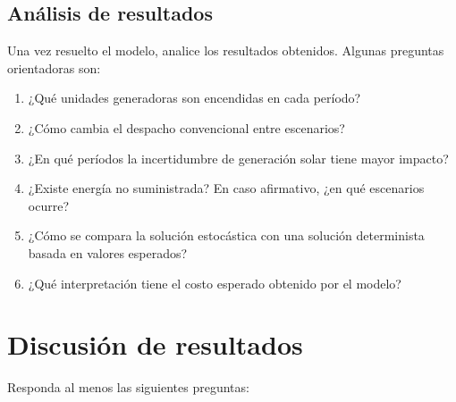 \documentclass[
	spanish, %
	letterpaper, oneside
]{article}
\begin{document}
\subsection{Análisis de resultados}

Una vez resuelto el modelo, analice los resultados obtenidos. Algunas preguntas orientadoras son:

\begin{enumerate}
\item ¿Qué unidades generadoras son encendidas en cada período?
\item ¿Cómo cambia el despacho convencional entre escenarios?
\item ¿En qué períodos la incertidumbre de generación solar tiene mayor impacto?
\item ¿Existe energía no suministrada? En caso afirmativo, ¿en qué escenarios ocurre?
\item ¿Cómo se compara la solución estocástica con una solución determinista basada en valores esperados?
\item ¿Qué interpretación tiene el costo esperado obtenido por el modelo?
\end{enumerate}

\section{Discusión de resultados}

Responda al menos las siguientes preguntas:
\end{document}
